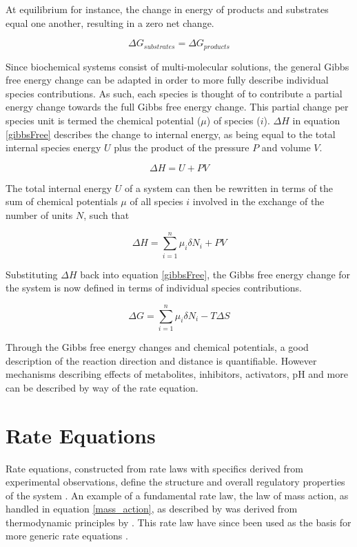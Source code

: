 At equilibrium for instance, the change in energy of products and substrates equal one another, resulting in a zero net change.

\begin{equation}
\Delta G_{substrates} = \Delta G_{products}
\end{equation}

Since biochemical systems consist of multi-molecular solutions, the general Gibbs free energy change can be adapted in order to more fully describe individual species contributions. As such, each species is thought of to contribute a partial energy change towards the full Gibbs free energy change. This partial change per species unit is termed the chemical potential ($\mu $) of species ($i$). $\Delta H$  in equation \ref{gibbsFree} describes the change to internal energy, as being equal to the total internal species energy $U$ plus the product of the pressure $P$ and volume $V$.

\begin{equation}
\Delta H = U + PV
\end{equation}

The total internal energy $U$ of a system can then be rewritten in terms of the sum of chemical potentials $\mu$ of all species $i$ involved in the exchange of the number of units $N$, such that

\begin{equation}
\Delta H = \sum^{n}_{i=1}\mu_i \delta N_i + PV
\end{equation}

Substituting $\Delta H$ back into equation \ref{gibbsFree}, the Gibbs free energy change for the system is now defined in terms of individual species contributions.

\begin{equation}
\Delta G = \sum_{i=1}^{n}\mu_i \delta N_i - T \Delta S
\end{equation}

Through the Gibbs free energy changes and chemical potentials, a good description of the reaction direction and distance is quantifiable. However mechanisms describing effects of metabolites, inhibitors, activators, pH and more can be described by way of the rate equation.

\section{Rate Equations}

Rate equations, constructed from rate laws with specifics derived from experimental observations, define the structure and overall regulatory properties of the system \cite{Teusink2000, Sorribas1995}. An example of a fundamental rate law, the law of mass action, as handled in equation \ref{mass_action}, as described by \citeauthor{Waage1986} was derived from thermodynamic principles by \citeauthor{VantHoff1884}. This rate law have since been used as the basis for more generic rate equations \cite{VantHoff1884, Waage1986, Voit2015}. 

